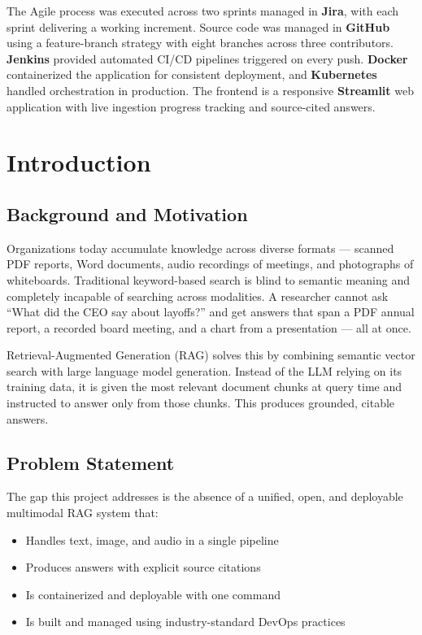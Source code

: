 \documentclass[12pt,a4paper]{report}
\begin{document}
The Agile process was executed across two sprints managed in \textbf{Jira}, with each sprint delivering a working increment. Source code was managed in \textbf{GitHub} using a feature-branch strategy with eight branches across three contributors. \textbf{Jenkins} provided automated CI/CD pipelines triggered on every push. \textbf{Docker} containerized the application for consistent deployment, and \textbf{Kubernetes} handled orchestration in production. The frontend is a responsive \textbf{Streamlit} web application with live ingestion progress tracking and source-cited answers.

\newpage
\tableofcontents
\newpage
\listoffigures
\newpage
\listoftables
\newpage

\chapter{Introduction}

\section{Background and Motivation}

Organizations today accumulate knowledge across diverse formats --- scanned PDF reports, Word documents, audio recordings of meetings, and photographs of whiteboards. Traditional keyword-based search is blind to semantic meaning and completely incapable of searching across modalities. A researcher cannot ask ``What did the CEO say about layoffs?'' and get answers that span a PDF annual report, a recorded board meeting, and a chart from a presentation --- all at once.

Retrieval-Augmented Generation (RAG) solves this by combining semantic vector search with large language model generation. Instead of the LLM relying on its training data, it is given the most relevant document chunks at query time and instructed to answer only from those chunks. This produces grounded, citable answers.

\section{Problem Statement}

The gap this project addresses is the absence of a unified, open, and deployable multimodal RAG system that:
\begin{itemize}[leftmargin=2cm]
    \item Handles text, image, and audio in a single pipeline
    \item Produces answers with explicit source citations
    \item Is containerized and deployable with one command
    \item Is built and managed using industry-standard DevOps practices
\end{itemize}
\end{document}
